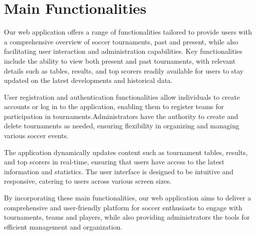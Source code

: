 \section{Main Functionalities}


Our web application offers a range of functionalities tailored to provide users with a comprehensive overview of soccer tournaments, past and present, while also facilitating user interaction and administration capabilities. Key functionalities include the ability to view both present and past tournaments, with relevant details such as tables, results, and top scorers readily available for users to stay updated on the latest developments and historical data.

User registration and authentication functionalities allow individuals to create accounts or log in to the application, enabling them to register teams for participation in tournaments.Administrators have the authority to create and delete tournaments as needed, ensuring flexibility in organizing and managing various soccer events.

The application dynamically updates content such as tournament tables, results, and top scorers in real-time, ensuring that users have access to the latest information and statistics. The user interface is designed to be intuitive and responsive, catering to users across various screen sizes.

By incorporating these main functionalities, our web application aims to deliver a comprehensive and user-friendly platform for soccer enthusiasts to engage with tournaments, teams and players, while also providing administrators the tools for efficient management and organization.
\newpage